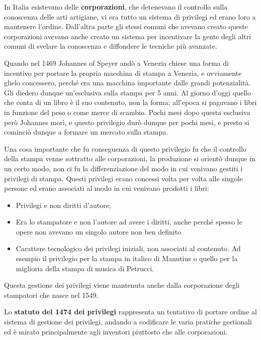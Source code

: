 In Italia esistevano delle \textbf{corporazioni}, che detenevano il controllo sulla conoscenza delle arti artigiane, vi era tutto un sistema di privilegi ed erano loro a mantenere l'ordine. Dall'altra parte gli stessi comuni che avevano creato queste corporazioni avevano anche creato un sistema per incentivare la gente degli altri comuni di svelare la conoscenza e diffondere le tecniche più avanzate. 

Quando nel 1469 Johannes of Speyer andò a Venezia chiese una forma di incentivo per portare la propria macchina di stampa a Venezia, e ovviamente glielo concessero, perché era una macchina importante dalle grandi potenzialità. Gli diedero dunque un'esclusiva sulla stampa per 5 anni. Al giorno d'oggi quello che conta di un libro è il suo contenuto, non la forma; all'epoca si pagavano i libri in funzione del peso o come merce di scambio. Pochi mesi dopo questa esclusiva però Johannes morì, e questo privilegio durò dunque per pochi mesi, e presto si cominciò dunque a formare un mercato sulla stampa. 

Una cosa importante che fu conseguenza di questo privilegio fu che il controllo della stampa venne sottratto alle corporazioni, la produzione si orientò dunque in un certo modo, non ci fu la differenziazione del modo in cui venivano gestiti i privilegi di stampa. Questi privilegi erano concessi volta per volta alle singole persone ed erano associati al modo in cui venivano prodotti i libri:

\begin{itemize}

\item Privilegi e non diritti d'autore; 
\item Era lo stampatore e non l'autore ad avere i diritti, anche perché spesso le opere non avevano un singolo autore non ben definito
\item Carattere tecnologico dei privilegi iniziali, non associati al contenuto. Ad esempio il privilegio per la stampa in italico di Manutius o quello per la miglioria della stampa di musica di Petrucci.

\end{itemize}

Questa gestione dei privilegi viene mantenuta anche dalla corporazione degli stampatori che nasce nel 1549.

Lo \textbf{statuto del 1474 dei privilegi} rappresenta un tentativo di portare ordine al sistema di gestione dei privilegi, andando a codificare le varia pratiche gestionali ed è mirato principalmente agli inventori piuttosto che alle corporazioni.

